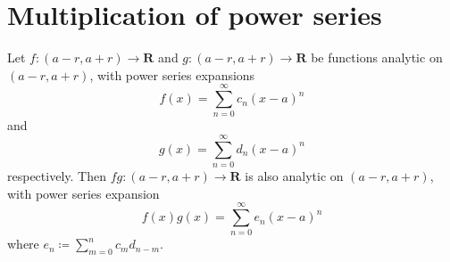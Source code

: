 \section{Multiplication of power series}\label{sec 4.4}

\begin{theorem}\label{4.4.1}
    Let \(f : (a - r, a + r) \to \mathbf{R}\) and \(g : (a - r, a + r) \to \mathbf{R}\) be functions analytic on \((a - r, a + r)\), with power series expansions
    \[
        f(x) = \sum_{n = 0}^\infty c_n (x - a)^n
    \]
    and
    \[
        g(x) = \sum_{n = 0}^\infty d_n (x - a)^n
    \]
    respectively.
    Then \(fg : (a - r, a + r) \to \mathbf{R}\) is also analytic on \((a - r, a + r)\), with power series expansion
    \[
        f(x) g(x) = \sum_{n = 0}^\infty e_n (x - a)^n
    \]
    where \(e_n \coloneqq \sum_{m = 0}^n c_m d_{n - m}\).
\end{theorem}

